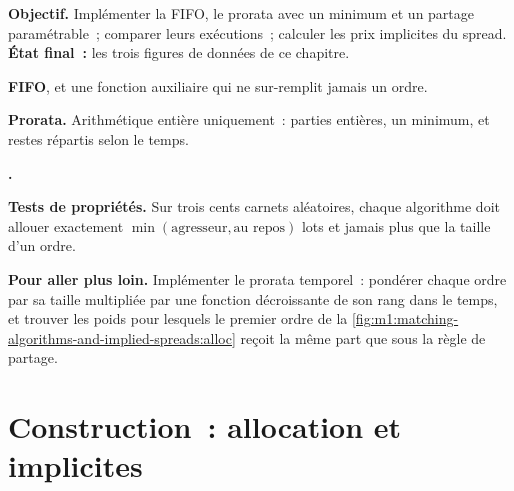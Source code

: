 \begin{tutorial}
\textbf{Objectif.} Implémenter la FIFO, le prorata avec un minimum et un partage
paramétrable~; comparer leurs exécutions~; calculer les prix implicites du spread. \textbf{État
final~:} les trois figures de données de ce chapitre.
\begin{tutsteps}
\item \textbf{FIFO}, et une fonction auxiliaire qui ne sur-remplit jamais un ordre.
\label{lst:m1:matching-algorithms-and-implied-spreads:fifo}
\item \textbf{Prorata.} Arithmétique entière uniquement~: parties entières, un minimum, et
restes répartis selon le temps.
\label{lst:m1:matching-algorithms-and-implied-spreads:prorata}
\item \textbf{.}
\label{lst:m1:matching-algorithms-and-implied-spreads:implied}
\item \textbf{Tests de propriétés.} Sur trois cents carnets aléatoires, chaque algorithme
doit allouer exactement $\min(\text{agresseur}, \text{au repos})$ lots et jamais plus que
la taille d'un ordre.
\end{tutsteps}
\textbf{Pour aller plus loin.} Implémenter le prorata temporel~: pondérer chaque ordre par
sa taille multipliée par une fonction décroissante de son rang dans le temps, et trouver les poids
pour lesquels le premier ordre de la \cref{fig:m1:matching-algorithms-and-implied-spreads:alloc}
reçoit la même part que sous la règle de partage.
\end{tutorial}

\section{Construction~: allocation et implicites}\label{bld:m1:matching-algorithms-and-implied-spreads:match}

